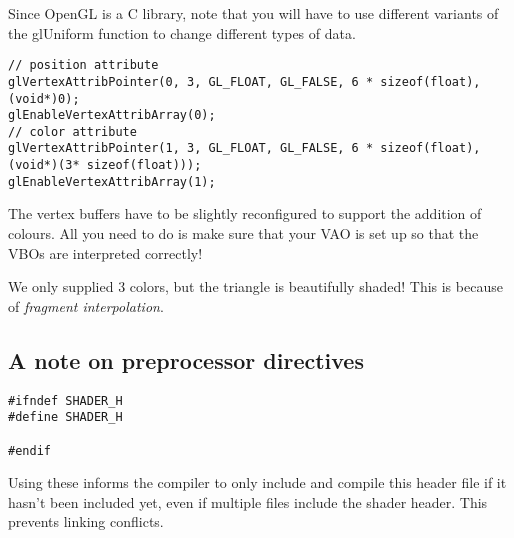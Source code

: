 \documentclass{article}
\begin{document}
Since OpenGL is a C library, note that you will have to use different variants of the glUniform function to change different types of data. 

\begin{Verbatim}
// position attribute
glVertexAttribPointer(0, 3, GL_FLOAT, GL_FALSE, 6 * sizeof(float), (void*)0);
glEnableVertexAttribArray(0);
// color attribute
glVertexAttribPointer(1, 3, GL_FLOAT, GL_FALSE, 6 * sizeof(float), (void*)(3* sizeof(float)));
glEnableVertexAttribArray(1);
\end{Verbatim}

The vertex buffers have to be slightly reconfigured to support the addition of colours. All you need to do is make sure that your VAO is set up so that the VBOs are interpreted correctly!

We only supplied 3 colors, but the triangle is beautifully shaded! This is because of \emph{fragment interpolation}. 

\subsection{A note on preprocessor directives}

\begin{Verbatim}
#ifndef SHADER_H
#define SHADER_H

#endif
\end{Verbatim}

Using these informs the compiler to only include and compile this header file if it hasn't been included yet, even if multiple files include the shader header. This prevents linking conflicts.
\end{document}
